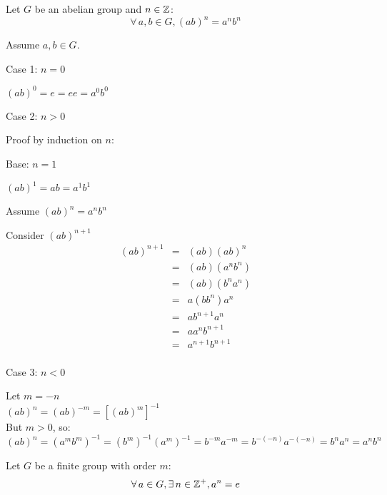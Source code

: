 \documentclass[letterpaper,12pt,fleqn]{article}
\begin{document}
\begin{theorem}
  Let $G$ be an abelian group and $n\in\mathbb{Z}$:
  \[\forall\,a,b\in G,(ab)^n=a^nb^n\]
\end{theorem}

\begin{theproof}
  Assume $a,b\in G$.
  \begin{description}
  \item{Case 1: $n=0$}
    
    $(ab)^0=e=ee=a^0b^0$

  \item{Case 2: $n>0$}

    Proof by induction on $n$:

    \begin{description}
    \item{Base: $n=1$}

      $(ab)^1=ab=a^1b^1$

    \item Assume $(ab)^n=a^nb^n$

    \item Consider $(ab)^{n+1}$
      \begin{eqnarray*}
        (ab)^{n+1} &=& (ab)(ab)^n \\
        &=& (ab)(a^nb^n) \\
        &=& (ab)(b^na^n) \\
        &=& a(bb^n)a^n \\
        &=& ab^{n+1}a^n \\
        &=& aa^nb^{n+1} \\
        &=& a^{n+1}b^{n+1} \\
      \end{eqnarray*}
    \end{description}

  \item{Case 3: $n<0$}

    Let $m=-n$ \\
    $(ab)^n=(ab)^{-m}=[(ab)^m]^{-1}$ \\
    But $m>0$, so: \\
    $(ab)^n=(a^mb^m)^{-1}=(b^m)^{-1}(a^m)^{-1}=b^{-m}a^{-m}=b^{-(-n)}a^{-(-n)}=
    b^na^n=a^nb^n$
  \end{description}
\end{theproof}

\begin{theorem}
  Let $G$ be a finite group with order $m$:
  \[\forall\,a\in G,\exists\,n\in\mathbb{Z}^+,a^n=e\]
\end{theorem}
\end{document}
